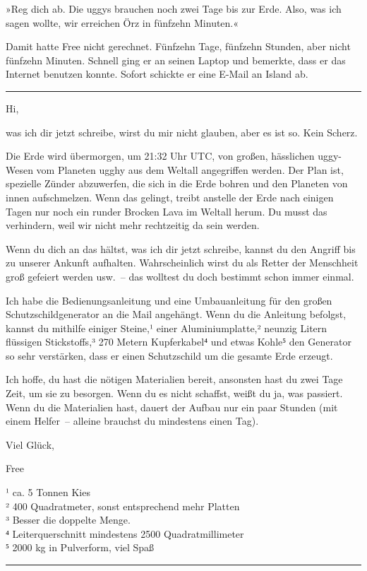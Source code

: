 »Reg dich ab. Die uggys brauchen noch zwei Tage bis zur Erde. Also, was ich sagen wollte, wir erreichen Örz in fünfzehn Minuten.«

Damit hatte Free nicht gerechnet. Fünfzehn Tage, fünfzehn Stunden, aber nicht fünfzehn Minuten. Schnell ging er an seinen Laptop und bemerkte, dass er das Internet benutzen konnte. Sofort schickte er eine E-Mail an Island ab.

\noindent \parbox{\textwidth}{ \vspace{3ex} \hrule \vspace{3ex}

    \begin{itshape}

Hi,

was ich dir jetzt schreibe, wirst du mir nicht glauben, aber es ist so. Kein Scherz.

Die Erde wird übermorgen, um 21:32 Uhr UTC, von großen, hässlichen uggy-Wesen vom Planeten ugghy aus dem Weltall angegriffen werden. Der Plan ist, spezielle Zünder abzuwerfen, die sich in die Erde bohren und den Planeten von innen aufschmelzen. Wenn das gelingt, treibt anstelle der Erde nach einigen Tagen nur noch ein runder Brocken Lava im Weltall herum. Du musst das verhindern, weil wir nicht mehr rechtzeitig da sein werden.

Wenn du dich an das hältst, was ich dir jetzt schreibe, kannst du den Angriff bis zu unserer Ankunft aufhalten. Wahrscheinlich wirst du als Retter der Menschheit groß gefeiert werden usw.~– das wolltest du doch bestimmt schon immer einmal.

Ich habe die Bedienungsanleitung und eine Umbauanleitung für den großen Schutzschildgenerator an die Mail angehängt. Wenn du die Anleitung befolgst, kannst du mithilfe einiger Steine,¹ einer Aluminiumplatte,² neunzig Litern flüssigen Stickstoffs,³ 270 Metern Kupferkabel⁴ und etwas Kohle⁵ den Generator so sehr verstärken, dass er einen Schutzschild um die gesamte Erde erzeugt.

Ich hoffe, du hast die nötigen Materialien bereit, ansonsten hast du zwei Tage Zeit, um sie zu besorgen. Wenn du es nicht schaffst, weißt du ja, was passiert. Wenn du die Materialien hast, dauert der Aufbau nur ein paar Stunden (mit einem Helfer~– alleine brauchst du mindestens einen Tag).

Viel Glück,

Free

\noindent¹ ca. 5 Tonnen Kies\\
\noindent² 400 Quadratmeter, sonst entsprechend mehr Platten\\
\noindent³ Besser die doppelte Menge.\\
\noindent⁴ Leiterquerschnitt mindestens 2500 Quadratmillimeter\\
\noindent⁵ 2000 kg in Pulverform, viel Spaß\\

    \end{itshape}

\vspace{3ex} \hrule \vspace{3ex} }

